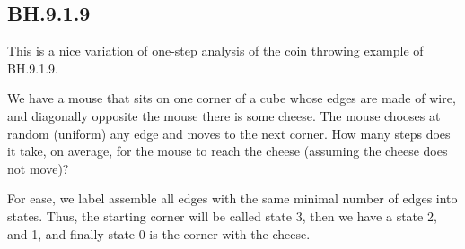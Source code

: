 \subsection{BH.9.1.9}
\label{sec:not-niet}

This is a nice variation of one-step analysis of the coin throwing example of BH.9.1.9.

We have a mouse that sits on one corner of a cube whose edges are made of wire, and  diagonally opposite the mouse there is some cheese.
The mouse chooses at random (uniform) any edge and moves to the next corner.
How many steps does it take, on average, for the mouse to reach the cheese (assuming the cheese does not move)?

For ease, we label assemble  all edges with the same minimal number of edges into states. Thus, the starting corner will be called state 3, then we have a state 2, and 1, and finally state 0 is the corner with the cheese.


